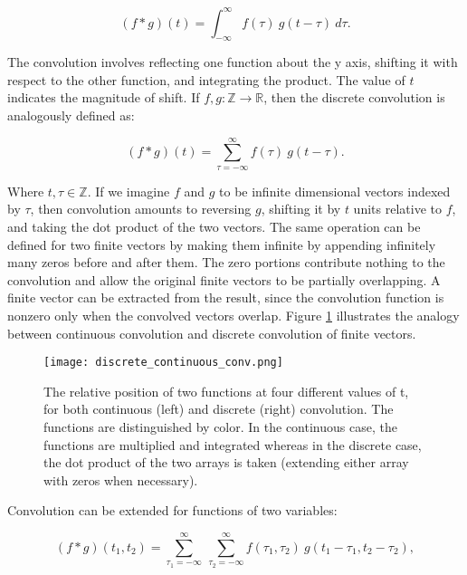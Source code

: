 \begin{equation}
(f*g)(t) = \int_{-\infty}^{\infty}f(\tau)~g(t-\tau)~d\tau.
\label{eq:math_conv}
\end{equation}

\noindent
The convolution involves reflecting one function about the y axis, shifting it with respect to the other function, and integrating the product. 
The value of $t$ indicates the magnitude of shift.
If $f, g \colon \mathbb{Z} \rightarrow \mathbb{R}$, then the discrete convolution is analogously defined as:

\begin{equation}
(f*g)(t) = \sum_{\tau = -\infty}^{\infty}f(\tau)~g(t-\tau).
\label{eq:math_conv}
\end{equation}

\noindent
Where $t, \tau \in \mathbb{Z}$.
If we imagine $f$ and $g$ to be infinite dimensional vectors indexed by $\tau$, then convolution amounts to reversing $g$, shifting it by $t$ units relative to $f$, and taking the dot product of the two vectors.
The same operation can be defined for two finite vectors by making them infinite by appending infinitely many zeros before and after them.
The zero portions contribute nothing to the convolution and allow the original finite vectors to be partially overlapping.
A finite vector can be extracted from the result, since the convolution function is nonzero only when the convolved vectors overlap.
Figure \ref{fig:cont_disc_conv} illustrates the analogy between continuous convolution and discrete convolution of finite vectors.

\begin{figure}
	\centering
	\texttt{[image: discrete\_continuous\_conv.png]}
	\caption{The relative position of two functions at four different values of t, for both continuous (left) and discrete (right) convolution. The functions are distinguished by color. In the continuous case, the functions are multiplied and integrated whereas in the discrete case, the dot product of the two arrays is taken (extending either array with zeros when necessary).}
	\label{fig:cont_disc_conv}
\end{figure}

Convolution can be extended for functions of two variables:

\begin{equation}
(f*g)(t_1, t_2) = \sum_{\tau_1 = -\infty}^{\infty} ~\sum_{\tau_2 = -\infty}^{\infty}f(\tau_1, \tau_2)~g(t_1-\tau_1, t_2-\tau_2), 
\label{eq:math_conv}
\end{equation}

